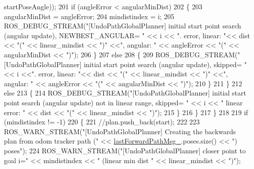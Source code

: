 \begin{DoxyCode}
      startPoseAngle));
201                         \textcolor{keywordflow}{if} (angleError < angularMinDist)
202                         \{
203                             angularMinDist = angleError;
204                             mindistindex = i;
205                             ROS\_DEBUG\_STREAM(\textcolor{stringliteral}{"[UndoPathGlobalPlanner] initial start point search (angular
       update), NEWBEST\_ANGULAR= "} << i << \textcolor{stringliteral}{". error, linear: "}<<  dist << \textcolor{stringliteral}{"("} << linear\_mindist << \textcolor{stringliteral}{")"} <<\textcolor{stringliteral}{", angular:
       "} << angleError << \textcolor{stringliteral}{"("} << angularMinDist << \textcolor{stringliteral}{")"});
206                         \}
207                         \textcolor{keywordflow}{else}
208                         \{
209                             ROS\_DEBUG\_STREAM(\textcolor{stringliteral}{"[UndoPathGlobalPlanner] initial start point search (angular
       update), skipped= "} << i <<\textcolor{stringliteral}{". error, linear: "}<<  dist << \textcolor{stringliteral}{"("} << linear\_mindist << \textcolor{stringliteral}{")"} <<\textcolor{stringliteral}{", angular: "}  << 
      angleError << \textcolor{stringliteral}{"("} << angularMinDist << \textcolor{stringliteral}{")"});
210                         \}
211                     \}
212                     \textcolor{keywordflow}{else}
213                     \{
214                         ROS\_DEBUG\_STREAM(\textcolor{stringliteral}{"[UndoPathGlobalPlanner] initial start point search (angular
       update) not in linear range, skipped= "} << i << \textcolor{stringliteral}{" linear error: "} << dist << \textcolor{stringliteral}{"("} << linear\_mindist << \textcolor{stringliteral}{")"});
215                     \}
216                 \}
217             \}
218 
219             \textcolor{keywordflow}{if} (mindistindex != -1)
220             \{
221                 \textcolor{comment}{//plan.push\_back(start);}
222 
223                 ROS\_WARN\_STREAM(\textcolor{stringliteral}{"[UndoPathGlobalPlanner] Creating the backwards plan from odom tracker path
       ("} << \hyperlink{classcl__move__base__z_1_1undo__path__global__planner_1_1UndoPathGlobalPlanner_a9a4a6e40f5b6cb5f77dedbc5b6170871}{lastForwardPathMsg\_}.poses.size() << \textcolor{stringliteral}{") poses"});
224                 ROS\_WARN\_STREAM(\textcolor{stringliteral}{"[UndoPathGlobalPlanner] closer point to goal i="} << mindistindex << \textcolor{stringliteral}{"
       (linear min dist "} << linear\_mindist << \textcolor{stringliteral}{")"});

\end{DoxyCode}
